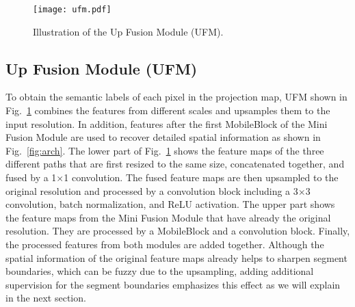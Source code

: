 \documentclass[letterpaper, 10 pt, journal, twoside]{ieeetran}
\newcommand{\figref}[1]{Fig.~\ref{#1}}
\begin{document}
\begin{figure}[!t]
    \centering
    \texttt{[image: ufm.pdf]}
    \caption{Illustration of the Up Fusion Module (UFM).}
    \label{fig:ufm}
    \vspace{-4mm}
\end{figure}

\begin{table}[!t]
    \centering
    \renewcommand{\tabcolsep}{3.5mm}
    \caption{Impact of the three modules.}
    \label{tab:ablation}
    \vspace{-3mm}
\end{table}


\subsection{Up Fusion Module (UFM)} \label{sec:ufm}
To obtain the semantic labels of each pixel in the projection map, UFM shown in \figref{fig:ufm} combines the features from different scales and upsamples them to the input resolution. In addition, features after the first MobileBlock of the Mini Fusion Module are used to recover detailed spatial information as shown in \figref{fig:arch}. The lower part of \figref{fig:ufm} shows the feature maps of the three different paths that are first resized to the same size, concatenated together, and fused by a 1$\times$1 convolution. The fused feature maps are then upsampled to the original resolution and processed by a convolution block including a 3$\times$3 convolution, batch normalization, and ReLU activation. The upper part shows the feature maps from the Mini Fusion Module that have already the original resolution. They are processed by a MobileBlock and a convolution block. Finally, the processed features from both modules are added together. Although the spatial information of the original feature maps already helps to sharpen segment boundaries, which can be fuzzy due to the upsampling, adding additional supervision for the segment boundaries emphasizes this effect as we will explain in the next section.
\end{document}
